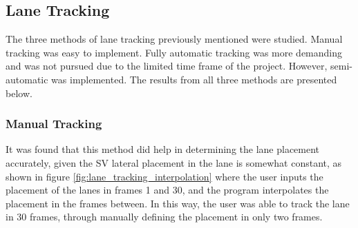 \subsection{Lane Tracking}

The three methods of lane tracking previously mentioned were studied. Manual tracking was easy to implement. Fully automatic tracking was more demanding and was not pursued due to the limited time frame of the project. However, semi-automatic was implemented. The results from all three methods are presented below. 
 
\subsubsection{Manual Tracking}

It was found that this method did help in determining the lane placement accurately, given the SV lateral placement in the lane is somewhat constant, as shown in figure \ref{fig:lane_tracking_interpolation} where the user inputs the placement of the lanes in frames 1 and 30, and the program interpolates the placement in the frames between. In this way, the user was able to track the lane in 30 frames, through manually defining the placement in only two frames. 

